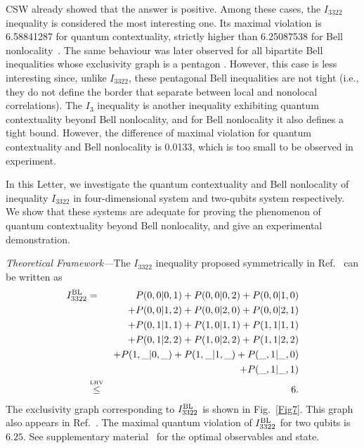 \documentclass[prl,letterpaper,english,reprint,nofootinbib,aps,superscriptaddress,showpacs,showkeys]{revtex4-1}
\theoremstyle{definition}
\theoremstyle{remark}
\begin{document}
CSW already showed that the answer is positive. 
Among these cases, the $I_{3322}$ inequality \cite{CSW10} is considered the most interesting one. Its maximal violation is 6.58841287 for quantum contextuality, strictly higher than 6.25087538 for Bell nonlocality~\cite{Pal10}. 
The same behaviour was later observed for all bipartite Bell inequalities whose exclusivity graph is a pentagon \cite{SBBC13}. However, this case is less interesting since, unlike $I_{3322}$, these pentagonal Bell inequalities are not tight (i.e., they do not define the border that separate between local and nonolocal correlations).
The $I_3$ inequality is another inequality exhibiting quantum contextuality beyond Bell nonlocality, and for Bell nonlocality it also defines a tight bound. However,
the difference of maximal violation for quantum contextuality and Bell nonlocality is 0.0133, which is too small to be observed in experiment.

In this Letter, we investigate the quantum contextuality and Bell nonlocality of inequality $I_{3322}$ in four-dimensional system and two-qubits system respectively. We show that these systems are adequate for proving the phenomenon of quantum contextuality beyond Bell nonlocality, and give an experimental demonstration.


\emph{Theoretical Framework---}The $I_{3322}$ inequality proposed symmetrically in Ref.~\cite{BG08} can be written as
 \begin{eqnarray}
 I_{3322}^{\rm BL}
 &=&P(0,0 \vert 0,1) + P(0,0 \vert 0,2) + P(0,0 \vert 1,0) \nonumber\\
 &&+ P(0,0 \vert 1,2) + P(0,0 \vert 2,0) + P(0,0 \vert 2,1) \nonumber \\
 &&+ P(0,1 \vert 1,1) + P(1,0 \vert 1,1) + P(1,1 \vert 1,1) \nonumber\\
 &&+ P(0,1 \vert 2,2) + P(1,0 \vert 2,2) + P(1,1 \vert 2,2) \nonumber \\
 &&+ P(1,\_ \vert 0,\_) +P(1,\_ \vert 1,\_) + P(\_,1 \vert \_,0)\nonumber \\
 && + P(\_,1 \vert \_,1)\nonumber\\
&\stackrel{\mbox{\tiny{LHV}}}{\leq}& 6.
\label{I3322BL}
\end{eqnarray}
The exclusivity graph corresponding to $I_{3322}^{\rm BL}$ is shown in Fig.~\ref{Fig7}. This graph also appears in Ref.~\cite{RDLTC14}.
The maximal quantum violation of $ I_{3322}^{\rm BL}$ for two qubits is $6.25$. See supplementary material~\cite{SM} for the optimal observables and state.
\end{document}

